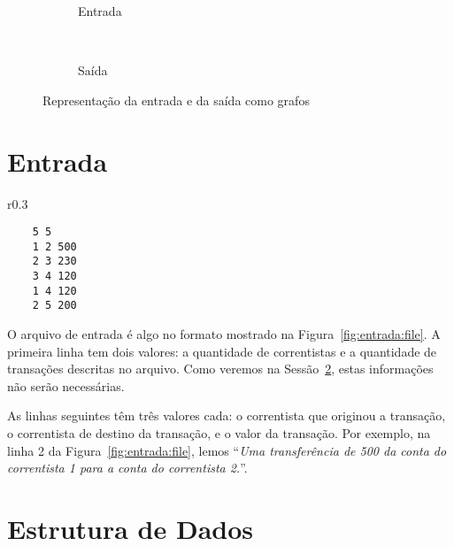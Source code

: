 \documentclass[12pt]{article}
\begin{document}
\begin{figure}[htb!]
  \centering
  \begin{subfigure}[b]{0.5\textwidth}
    \begin{dot2tex}[neato,options=-tmath]
        
    \end{dot2tex}
    \caption{Entrada}
    \label{fig:intro:entrada}
  \end{subfigure}%
  ~
  \begin{subfigure}[b]{0.5\textwidth}
    \begin{dot2tex}[neato,options=-tmath]
        
    \end{dot2tex}
    \caption{Saída}
    \label{fig:intro:saída}
  \end{subfigure}
  \caption{Representação da entrada e da saída como grafos}
  \label{fig:intro}
\end{figure}

\section{Entrada}\label{sec:entrada}

\begin{wrapfigure}{r}{0.3\textwidth}
  \vspace{-20pt}
  \begin{center}
    \begin{lstlisting}
    5 5
    1 2 500
    2 3 230
    3 4 120
    1 4 120
    2 5 200
    \end{lstlisting}
  \end{center}
  \caption{Arquivo de entrada}
  \vspace{-10pt}
\label{fig:entrada:file}
\end{wrapfigure}

O arquivo de entrada é algo no formato mostrado na Figura~\ref{fig:entrada:file}.
A primeira linha tem dois valores: a quantidade de correntistas e a quantidade
de transações descritas no arquivo. Como veremos na Sessão~\ref{sec:estrutura},
estas informações não serão necessárias.

As linhas seguintes têm três valores cada: o correntista que originou a
transação, o correntista de destino da transação, e o valor da transação. Por
exemplo, na linha 2 da Figura~\ref{fig:entrada:file}, lemos ``\textit{Uma
  transferência de 500 da conta do correntista 1 para a conta do correntista 2.}''.

\section{Estrutura de Dados}\label{sec:estrutura}
\end{document}
